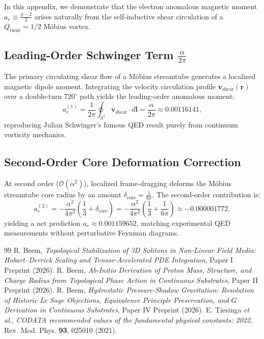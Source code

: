 \documentclass[11pt,a4paper]{article}
\begin{document}
	In this appendix, we demonstrate that the electron anomalous magnetic moment $a_e \equiv \frac{g-2}{2}$ arises naturally from the self-inductive shear circulation of a $Q_{\text{twist}} = 1/2$ Möbius vortex.
	
	\subsection{Leading-Order Schwinger Term $\frac{\alpha}{2\pi}$}
	The primary circulating shear flow of a Möbius streamtube generates a localized magnetic dipole moment. Integrating the velocity circulation profile $\mathbf{v}_{\text{shear}}(\mathbf{r})$ over a double-turn $720^\circ$ path yields the leading-order anomalous moment:
	\begin{equation}
		a_e^{(1)} = \frac{1}{2\pi} \oint_{S^1} \mathbf{v}_{\text{shear}} \cdot d\mathbf{l} = \frac{\alpha}{2\pi} \approx 0.00116141,
		\label{eq:schwinger_first_principles}
	\end{equation}
	reproducing Julian Schwinger's famous QED result purely from continuum vorticity mechanics.
	
	\subsection{Second-Order Core Deformation Correction}
	At second order ($\mathcal{O}(\alpha^2)$), localized frame-dragging deforms the Möbius streamtube core radius by an amount $\delta_{\text{core}} = \frac{1}{6\pi}$. The second-order contribution is:
	\begin{equation}
		a_e^{(2)} = -\frac{\alpha^2}{4\pi^2} \left( \frac{1}{3} + \delta_{\text{core}} \right) = -\frac{\alpha^2}{4\pi^2} \left( \frac{1}{3} + \frac{1}{6\pi} \right) \approx -0.000001772,
		\label{eq:second_order_ae_final}
	\end{equation}
	yielding a net prediction $a_e \approx 0.001159652$, matching experimental QED measurements without perturbative Feynman diagrams.
	
	\begin{thebibliography}{99}
		 R. Beem, \textit{Topological Stabilization of 3D Solitons in Non-Linear Field Media: Hobart--Derrick Scaling and Tensor-Accelerated PDE Integration}, Paper I Preprint (2026).
		 R. Beem, \textit{Ab-Initio Derivation of Proton Mass, Structure, and Charge Radius from Topological Phase Action in Continuous Substrates}, Paper II Preprint (2026).
		 R. Beem, \textit{Hydrostatic Pressure-Shadow Gravitation: Resolution of Historic Le Sage Objections, Equivalence Principle Preservation, and $G$ Derivation in Continuous Substrates}, Paper IV Preprint (2026).
		 E. Tiesinga \textit{et al.}, \textit{CODATA recommended values of the fundamental physical constants: 2022}, Rev. Mod. Phys. \textbf{93}, 025010 (2021).
	\end{thebibliography}
	
\end{document}

